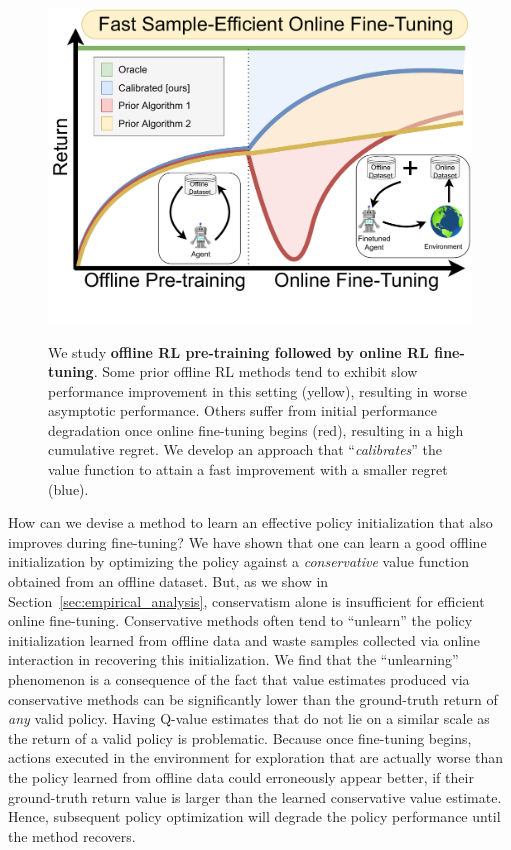 \begin{figure}
    \vspace{-0.3cm}
    \begin{center}
    {\includegraphics[width=0.85\linewidth]{chapters/cal_ql/figs-sample/Teaser_V2.pdf}}
    \vspace{-0.4cm}
    \caption{
    \footnotesize{We study \textbf{offline RL pre-training followed by online RL fine-tuning}. Some prior offline RL methods tend to exhibit slow performance improvement in this setting (yellow), resulting in worse asymptotic performance. Others suffer from initial performance degradation once online fine-tuning begins (red), resulting in a high cumulative regret. We develop an approach that ``\emph{calibrates}'' the value function to attain a fast improvement with a smaller regret (blue).}}
    \vspace{-0.7cm}
    \label{fig:teaser}
    \end{center}
\end{figure}
How can we devise a method to learn an effective policy initialization that also improves during fine-tuning? We have shown that one can learn a good offline initialization by optimizing the policy against a \emph{conservative} value function obtained from an offline dataset. But, as we show in Section~\ref{sec:empirical_analysis}, conservatism alone is insufficient for efficient online fine-tuning. Conservative methods often tend to ``unlearn'' the policy initialization learned from offline data and waste samples collected via online interaction in recovering this initialization. We find that the ``unlearning'' phenomenon is a consequence of the fact that value estimates produced via conservative methods can be significantly lower than the ground-truth return of \emph{any} valid policy. Having Q-value estimates that do not lie on a similar scale as the return of a valid policy is problematic. Because once fine-tuning begins, actions executed in the environment for exploration that are actually worse than the policy learned from offline data could erroneously appear better, if their ground-truth return value is larger than the learned conservative value estimate. Hence, subsequent policy optimization will degrade the policy performance until the method recovers.  

